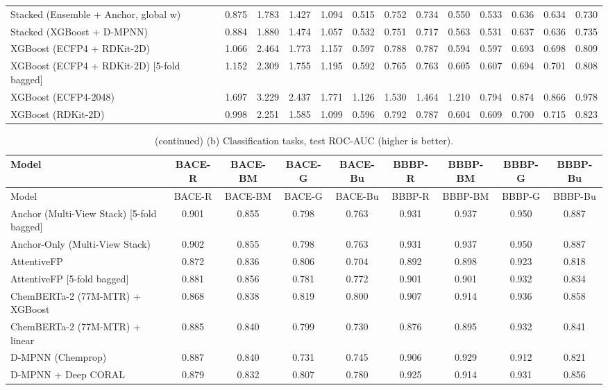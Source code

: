 \documentclass[11pt]{article}
\begin{document}
\begin{landscape}
{\begin{longtable}{lcccccccccccc}
Stacked (Ensemble + Anchor, global w) & 0.875 & 1.783 & 1.427 & 1.094 & 0.515 & 0.752 & 0.734 & 0.550 & 0.533 & 0.636 & 0.634 & 0.730 \\
Stacked (XGBoost + D-MPNN) & 0.884 & 1.880 & 1.474 & 1.057 & 0.532 & 0.751 & 0.717 & 0.563 & 0.531 & 0.637 & 0.636 & 0.735 \\
XGBoost (ECFP4 + RDKit-2D) & 1.066 & 2.464 & 1.773 & 1.157 & 0.597 & 0.788 & 0.787 & 0.594 & 0.597 & 0.693 & 0.698 & 0.809 \\
XGBoost (ECFP4 + RDKit-2D) [5-fold bagged] & 1.152 & 2.309 & 1.755 & 1.195 & 0.592 & 0.765 & 0.763 & 0.605 & 0.607 & 0.694 & 0.701 & 0.808 \\
XGBoost (ECFP4-2048) & 1.697 & 3.229 & 2.437 & 1.771 & 1.126 & 1.530 & 1.464 & 1.210 & 0.794 & 0.874 & 0.866 & 0.978 \\
XGBoost (RDKit-2D) & 0.998 & 2.251 & 1.585 & 1.099 & 0.596 & 0.792 & 0.787 & 0.604 & 0.609 & 0.700 & 0.715 & 0.823 \\
\bottomrule
\end{longtable}
\addtocounter{table}{-1}
\begin{longtable}{lcccccccc}
\caption{(continued) (b) Classification tasks, test ROC-AUC (higher is better).}\\
\toprule
Model & BACE-R & BACE-BM & BACE-G & BACE-Bu & BBBP-R & BBBP-BM & BBBP-G & BBBP-Bu \\
\midrule
\endfirsthead
\toprule
Model & BACE-R & BACE-BM & BACE-G & BACE-Bu & BBBP-R & BBBP-BM & BBBP-G & BBBP-Bu \\
\midrule
\endhead
Anchor (Multi-View Stack) [5-fold bagged] & 0.901 & 0.855 & 0.798 & 0.763 & 0.931 & 0.937 & 0.950 & 0.887 \\
Anchor-Only (Multi-View Stack) & 0.902 & 0.855 & 0.798 & 0.763 & 0.931 & 0.937 & 0.950 & 0.887 \\
AttentiveFP & 0.872 & 0.836 & 0.806 & 0.704 & 0.892 & 0.898 & 0.923 & 0.818 \\
AttentiveFP [5-fold bagged] & 0.881 & 0.856 & 0.781 & 0.772 & 0.901 & 0.901 & 0.932 & 0.834 \\
ChemBERTa-2 (77M-MTR) + XGBoost & 0.868 & 0.838 & 0.819 & 0.800 & 0.907 & 0.914 & 0.936 & 0.858 \\
ChemBERTa-2 (77M-MTR) + linear & 0.885 & 0.840 & 0.799 & 0.730 & 0.876 & 0.895 & 0.932 & 0.841 \\
D-MPNN (Chemprop) & 0.887 & 0.840 & 0.731 & 0.745 & 0.906 & 0.929 & 0.912 & 0.821 \\
D-MPNN + Deep CORAL & 0.879 & 0.832 & 0.807 & 0.780 & 0.925 & 0.914 & 0.931 & 0.856 \\

\end{longtable}}
\end{landscape}
\end{document}
